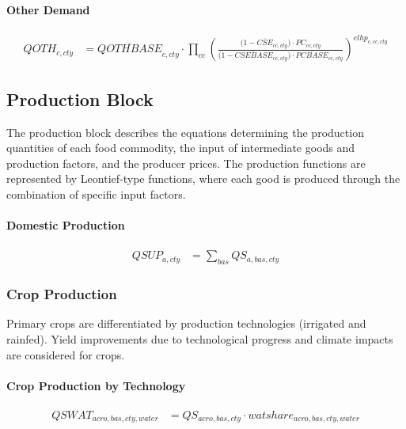 \paragraph{Other Demand}
\begin{align}
  QOTH_{c,cty}
  &= \overline{QOTHBASE}_{c,cty}
     \cdot
     \prod_{cc}\!
     \left(
       \frac{\bigl(1-\overline{CSE}_{cc,cty}\bigr)\cdot PC_{cc,cty}}
            {\bigl(1-\overline{CSEBASE}_{cc,cty}\bigr)\cdot \overline{PCBASE}_{cc,cty}}
     \right)^{elhp_{c,cc,cty}}
  \tag{QOTHEQ}\label{eq:QOTHEQ}
\end{align}


\subsection{Production Block}

The production block describes the equations determining the production quantities of each food commodity, the input of intermediate goods and production factors, and the producer prices.  
The production functions are represented by Leontief-type functions, where each good is produced through the combination of specific input factors.

\paragraph{Domestic Production}
\begin{align}
  QSUP_{a,cty}
  &= \sum_{bas} QS_{a,bas,cty}
  \tag{QSUPEQ}\label{eq:QSUPEQ}
\end{align}

\subsubsection{Crop Production}

Primary crops are differentiated by production technologies (irrigated and rainfed).
Yield improvements due to technological progress and climate impacts are considered for crops.

\paragraph{Crop Production by Technology}
\begin{align}
  QSWAT_{acro,bas,cty,water}
  &= QS_{acro,bas,cty} \cdot watshare_{acro,bas,cty,water}
  \tag{CROWATEREQ}\label{eq:CROWATEREQ}
\end{align}

